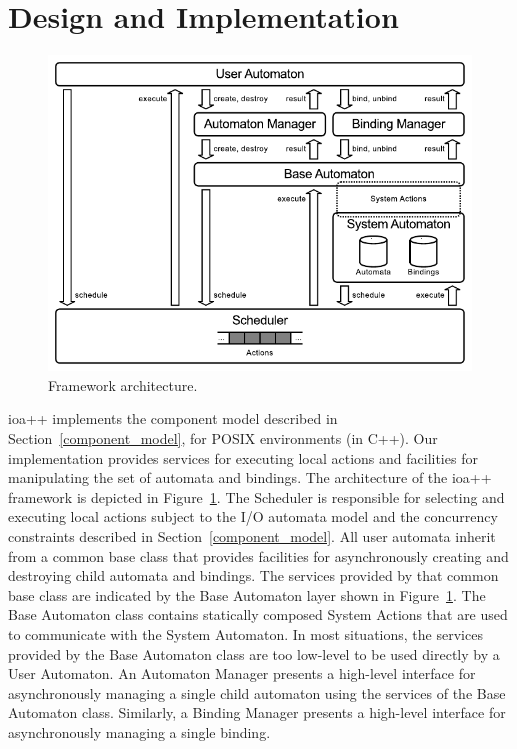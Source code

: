 \section{Design and Implementation\label{design}}

\begin{figure}
\center
\includegraphics[width=\columnwidth]{architecture}
\caption{Framework architecture.}
\label{framework_architecture}
\end{figure}

ioa++ implements the component model described in Section~\ref{component_model}, for POSIX environments (in C++).
Our implementation provides services for executing local actions and facilities for manipulating the set of automata and bindings.
The architecture of the ioa++ framework is depicted in Figure~\ref{framework_architecture}.
The Scheduler is responsible for selecting and executing local actions subject to the I/O automata model and the concurrency constraints described in Section~\ref{component_model}.
All user automata inherit from a common base class that provides facilities for asynchronously creating and destroying child automata and bindings.
The services provided by that common base class are indicated by the Base Automaton layer shown in Figure~\ref{framework_architecture}.
The Base Automaton class contains statically composed System Actions that are used to communicate with the System Automaton.
In most situations, the services provided by the Base Automaton class are too low-level to be used directly by a User Automaton.
An Automaton Manager presents a high-level interface for asynchronously managing a single child automaton using the services of the Base Automaton class.
Similarly, a Binding Manager presents a high-level interface for asynchronously managing a single binding.

